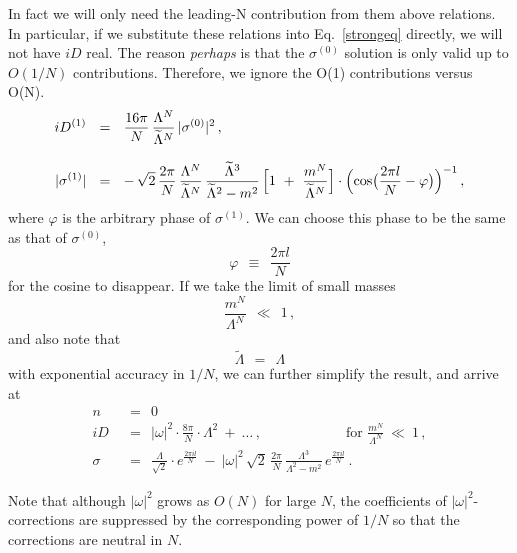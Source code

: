 \documentclass[12pt]{article}
\newcommand{\wt}{\widetilde}
\newcommand{\Do}{{D^{(1)}}}
\newcommand{\sigz}{{\sigma^{(0)}}}
\newcommand{\sigo}{{\sigma^{(1)}}}
\begin{document}
	In fact we will only need the leading-N contribution from them above relations.
	In particular, if we substitute these relations into Eq.~\eqref{strongeq} directly,
	we will not have $ iD $ real.
	The reason {\it perhaps} is that the $ \sigz $ solution is only valid up to $ O(1/N) $
	contributions.
	Therefore, we ignore the O(1) contributions versus O(N).
\begin{align*}
%
	i \Do & ~~=~~ \frac{16\pi}{N}\, \frac{\Lambda^N}{\wt{\Lambda}{}^N}\, |\sigz|^2\,,
	\\[3mm]
%
	| \sigo | & ~~=~~
	-\, \sqrt{2}\,\frac{2\pi}{N}\, \frac{\Lambda^N}{\wt{\Lambda}{}^N}\,
		\frac{ \wt{\Lambda}{}^3 } {\wt{\Lambda}{}^2 - m^2 }\,
		\Bigl[ 1 ~+~ \frac{m^N}{\wt{\Lambda}{}^N} \Bigr] \cdot
		\Bigl( \cos \bigl( \frac{2\pi l }{N} - \varphi \bigr) \Bigr)^{-1}\,,
\end{align*}
	where $ \varphi $ is the arbitrary phase of $ \sigo $.
	We can choose this phase to be the same as that of $ \sigz $, 
\[
	\varphi ~~\equiv~~ \frac{2\pi l}{N}
\]
	for the cosine to disappear.
	If we take the limit of small masses
\[
	\frac{m^N}{\Lambda^N} ~~\ll~~ 1\,,
\]
	and also note that
\[
	\wt{\Lambda} ~~=~~ \Lambda 
\]
	with exponential accuracy in $ 1/N $,
	we can further simplify the result, and arrive at
\begin{align*}
%
	n & ~~=~~ 0 
	\\[3mm]
%
	i D &  ~~=~~ |\omega|^2 \cdot \frac{8\pi}{N}\cdot \Lambda^2 ~+~ \ldots \,, 
	\qquad\qquad\qquad \text{for }\frac{m^N}{\Lambda^N} ~\ll~ 1\,,
	\\[3mm]
%
	\sigma & ~~=~~ \frac{\Lambda}{\sqrt 2} \cdot e^{\frac{2\pi i l}{N}} 
			~-~ |\omega|^2\, \sqrt{2}\, \frac{2\pi}{N}\, 
				\frac{\Lambda^3}{\Lambda^2 - m^2}\, e^{\frac{2\pi i l}{N}}
	\,.
\end{align*}

	Note that although $ |\omega|^2 $ grows as $ O(N) $ for large $N$, the coefficients of 
	$|\omega|^2$-corrections are suppressed by the corresponding power of $ 1/N $ so that 
	the corrections are neutral in $ N $.
\end{document}
